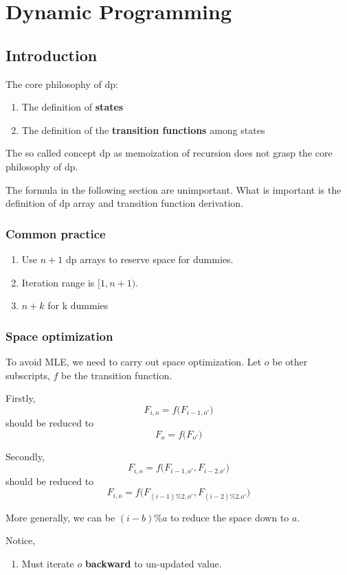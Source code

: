 \chapter{Dynamic Programming}



\section{Introduction}
The core philosophy of dp:
\begin{enumerate}
\item The definition of \textbf{states} 
\item The definition of the \textbf{transition functions} among states 
\end{enumerate} 

The so called concept dp as memoization of recursion does not grasp the core philosophy of dp. 

The formula in the following section are unimportant. What is important is the definition of dp array and transition function derivation.
\subsection{Common practice}
\begin{enumerate}
\item Use $n+1$ dp arrays to reserve space for dummies. 
\item Iteration range is $[1, n+1)$.
\item $n+k$ for k dummies  
\end{enumerate}
\subsection{Space optimization}
To avoid MLE, we need to carry out space optimization. Let $o$ be other subscripts, $f$ be the transition function. 

Firstly,
$$
F_{i, o} = f\big(F_{i-1, o'}\big)
$$
should be reduced to 
$$
F_{o} = f\big(F_{o'}\big)
$$

Secondly,
$$
F_{i, o} = f\big(F_{i-1, o'}, F_{i-2. o'}\big)
$$
should be reduced to 
$$
F_{i, o} = f\big(F_{(i-1)\%2, o'}, F_{(i-2)\%2. o'}\big)
$$

More generally, we can be $(i-b)\%a$ to reduce the space down to $a$.

Notice,
\begin{enumerate}
\item Must iterate $o$ \textbf{backward} to un-updated value. 
\end{enumerate}



